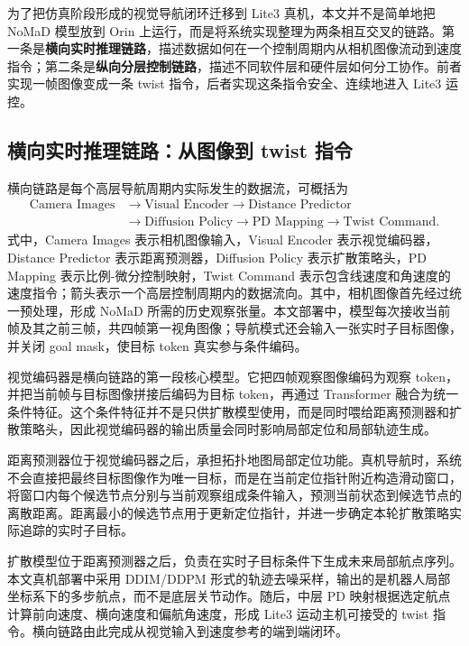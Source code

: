 为了把仿真阶段形成的视觉导航闭环迁移到 Lite3 真机，本文并不是简单地把 NoMaD 模型放到 Orin 上运行，而是将系统实现整理为两条相互交叉的链路。第一条是\textbf{横向实时推理链路}，描述数据如何在一个控制周期内从相机图像流动到速度指令；第二条是\textbf{纵向分层控制链路}，描述不同软件层和硬件层如何分工协作。前者实现一帧图像变成一条 twist 指令，后者实现这条指令安全、连续地进入 Lite3 运控。

\subsection{横向实时推理链路：从图像到 twist 指令}

横向链路是每个高层导航周期内实际发生的数据流，可概括为
\begin{equation}
\begin{aligned}
\text{Camera Images} &\rightarrow \text{Visual Encoder}
\rightarrow \text{Distance Predictor} \\
&\rightarrow \text{Diffusion Policy}
\rightarrow \text{PD Mapping}
\rightarrow \text{Twist Command}.
\end{aligned}
\end{equation}
式中，Camera Images 表示相机图像输入，Visual Encoder 表示视觉编码器，Distance Predictor 表示距离预测器，Diffusion Policy 表示扩散策略头，PD Mapping 表示比例-微分控制映射，Twist Command 表示包含线速度和角速度的速度指令；箭头表示一个高层控制周期内的数据流向。其中，相机图像首先经过统一预处理，形成 NoMaD 所需的历史观察张量。本文部署中，模型每次接收当前帧及其之前三帧，共四帧第一视角图像；导航模式还会输入一张实时子目标图像，并关闭 goal mask，使目标 token 真实参与条件编码。

视觉编码器是横向链路的第一段核心模型。它把四帧观察图像编码为观察 token，并把当前帧与目标图像拼接后编码为目标 token，再通过 Transformer 融合为统一条件特征。这个条件特征并不是只供扩散模型使用，而是同时喂给距离预测器和扩散策略头，因此视觉编码器的输出质量会同时影响局部定位和局部轨迹生成。

距离预测器位于视觉编码器之后，承担拓扑地图局部定位功能。真机导航时，系统不会直接把最终目标图像作为唯一目标，而是在当前定位指针附近构造滑动窗口，将窗口内每个候选节点分别与当前观察组成条件输入，预测当前状态到候选节点的离散距离。距离最小的候选节点用于更新定位指针，并进一步确定本轮扩散策略实际追踪的实时子目标。

扩散模型位于距离预测器之后，负责在实时子目标条件下生成未来局部航点序列。本文真机部署中采用 DDIM/DDPM 形式的轨迹去噪采样，输出的是机器人局部坐标系下的多步航点，而不是底层关节动作。随后，中层 PD 映射根据选定航点计算前向速度、横向速度和偏航角速度，形成 Lite3 运动主机可接受的 twist 指令。横向链路由此完成从视觉输入到速度参考的端到端闭环。


